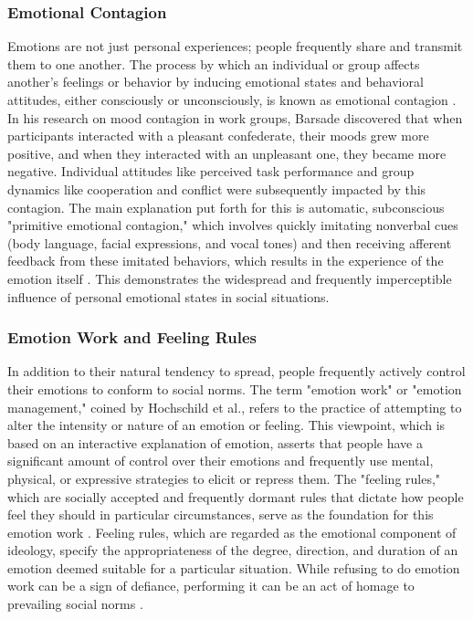 \documentclass{DESSThesis}
\begin{document}
\subsubsection{Emotional Contagion}
Emotions are not just personal experiences; people frequently share and transmit them to one another. The process by which an individual or group affects another's feelings or behavior by inducing emotional states and behavioral attitudes, either consciously or unconsciously, is known as emotional contagion \cite{barsade_ripple_2002}. In his research on mood contagion in work groups, Barsade discovered that when participants interacted with a pleasant confederate, their moods grew more positive, and when they interacted with an unpleasant one, they became more negative. Individual attitudes like perceived task performance and group dynamics like cooperation and conflict were subsequently impacted by this contagion. The main explanation put forth for this is automatic, subconscious "primitive emotional contagion," which involves quickly imitating nonverbal cues (body language, facial expressions, and vocal tones) and then receiving afferent feedback from these imitated behaviors, which results in the experience of the emotion itself \cite{barsade_ripple_2002}. This demonstrates the widespread and frequently imperceptible influence of personal emotional states in social situations.

\subsubsection{Emotion Work and Feeling Rules}
In addition to their natural tendency to spread, people frequently actively control their emotions to conform to social norms. The term "emotion work" or "emotion management," coined by Hochschild et al., refers to the practice of attempting to alter the intensity or nature of an emotion or feeling. This viewpoint, which is based on an interactive explanation of emotion, asserts that people have a significant amount of control over their emotions and frequently use mental, physical, or expressive strategies to elicit or repress them. The "feeling rules," which are socially accepted and frequently dormant rules that dictate how people feel they should in particular circumstances, serve as the foundation for this emotion work \cite{hochschild_emotion_1979}. Feeling rules, which are regarded as the emotional component of ideology, specify the appropriateness of the degree, direction, and duration of an emotion deemed suitable for a particular situation. While refusing to do emotion work can be a sign of defiance, performing it can be an act of homage to prevailing social norms \cite{hochschild_emotion_1979}.
\end{document}
